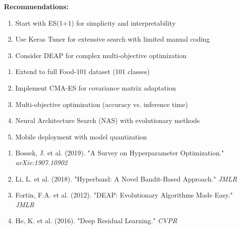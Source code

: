 \documentclass[a0,landscape]{a0poster}
\begin{document}
\begin{minipage}[t]{0.32\linewidth}
\begin{tcolorbox}[boxstyle, title=CONCLUSION]
\textbf{Recommendations:}
\begin{enumerate}[leftmargin=*,noitemsep]
    \item Start with ES(1+1) for simplicity and interpretability
    \item Use Keras Tuner for extensive search with limited manual coding
    \item Consider DEAP for complex multi-objective optimization
\end{enumerate}
\end{tcolorbox}

\vspace{0.5cm}

\begin{tcolorbox}[boxstyle, title=FUTURE WORK]
\begin{enumerate}[leftmargin=*,noitemsep]
    \item Extend to full Food-101 dataset (101 classes)
    \item Implement CMA-ES for covariance matrix adaptation
    \item Multi-objective optimization (accuracy vs. inference time)
    \item Neural Architecture Search (NAS) with evolutionary methods
    \item Mobile deployment with model quantization
\end{enumerate}
\end{tcolorbox}

\vspace{0.5cm}

\begin{tcolorbox}[boxstyle, title=REFERENCES]
\small
\begin{enumerate}[leftmargin=*,noitemsep]
    \item Bossek, J. et al. (2019). "A Survey on Hyperparameter Optimization." \textit{arXiv:1907.10902}
    \item Li, L. et al. (2018). "Hyperband: A Novel Bandit-Based Approach." \textit{JMLR}
    \item Fortin, F.A. et al. (2012). "DEAP: Evolutionary Algorithms Made Easy." \textit{JMLR}
    \item He, K. et al. (2016). "Deep Residual Learning." \textit{CVPR}
\end{enumerate}
\end{tcolorbox}

\end{minipage}
\end{document}
